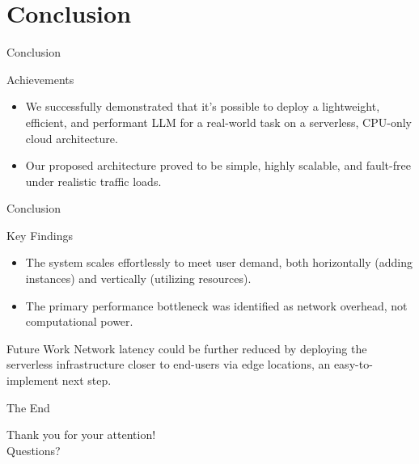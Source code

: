 \documentclass{beamer}
\begin{document}
\section{Conclusion}
\begin{frame}{Conclusion}
    \begin{block}{Achievements}
        \begin{itemize}
            \item We successfully demonstrated that it's possible to deploy a lightweight, efficient, and performant LLM for a real-world task on a serverless, CPU-only cloud architecture.
            \item Our proposed architecture proved to be simple, highly scalable, and fault-free under realistic traffic loads.
        \end{itemize}
    \end{block}
\end{frame}

\begin{frame}{Conclusion}
    \begin{alertblock}{Key Findings}
        \begin{itemize}
            \item The system scales effortlessly to meet user demand, both horizontally (adding instances) and vertically (utilizing resources).
            \item The primary performance bottleneck was identified as network overhead, not computational power.
        \end{itemize}
    \end{alertblock}
    \begin{exampleblock}{Future Work}
        Network latency could be further reduced by deploying the serverless infrastructure closer to end-users via edge locations, an easy-to-implement next step.
    \end{exampleblock}
\end{frame}


\begin{frame}{The End}
    \begin{center}
        \Huge Thank you for your attention!\\
        Questions?
    \end{center}
\end{frame}
\end{document}
